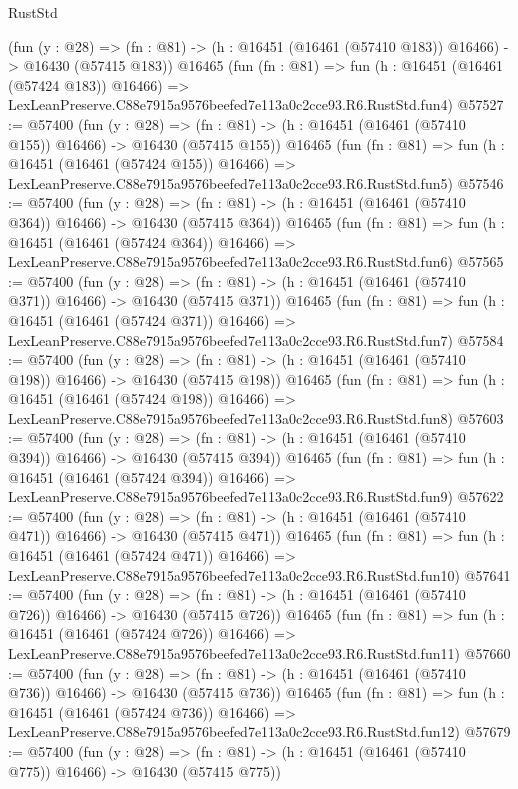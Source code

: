 \begin{lexlean}{RustStd}
\begin{coremodule}
    (fun (y : @28) =>
    (fn : @81) -> (h : @16451 (@16461 (@57410 @183)) @16466) -> @16430 (@57415 @183))
    @16465
    (fun (fn : @81) =>
    fun (h : @16451 (@16461 (@57424 @183)) @16466) =>
    LexLeanPreserve.C88e7915a9576beefed7e113a0c2cce93.R6.RustStd.fun4)
@57527 := @57400
    (fun (y : @28) =>
    (fn : @81) -> (h : @16451 (@16461 (@57410 @155)) @16466) -> @16430 (@57415 @155))
    @16465
    (fun (fn : @81) =>
    fun (h : @16451 (@16461 (@57424 @155)) @16466) =>
    LexLeanPreserve.C88e7915a9576beefed7e113a0c2cce93.R6.RustStd.fun5)
@57546 := @57400
    (fun (y : @28) =>
    (fn : @81) -> (h : @16451 (@16461 (@57410 @364)) @16466) -> @16430 (@57415 @364))
    @16465
    (fun (fn : @81) =>
    fun (h : @16451 (@16461 (@57424 @364)) @16466) =>
    LexLeanPreserve.C88e7915a9576beefed7e113a0c2cce93.R6.RustStd.fun6)
@57565 := @57400
    (fun (y : @28) =>
    (fn : @81) -> (h : @16451 (@16461 (@57410 @371)) @16466) -> @16430 (@57415 @371))
    @16465
    (fun (fn : @81) =>
    fun (h : @16451 (@16461 (@57424 @371)) @16466) =>
    LexLeanPreserve.C88e7915a9576beefed7e113a0c2cce93.R6.RustStd.fun7)
@57584 := @57400
    (fun (y : @28) =>
    (fn : @81) -> (h : @16451 (@16461 (@57410 @198)) @16466) -> @16430 (@57415 @198))
    @16465
    (fun (fn : @81) =>
    fun (h : @16451 (@16461 (@57424 @198)) @16466) =>
    LexLeanPreserve.C88e7915a9576beefed7e113a0c2cce93.R6.RustStd.fun8)
@57603 := @57400
    (fun (y : @28) =>
    (fn : @81) -> (h : @16451 (@16461 (@57410 @394)) @16466) -> @16430 (@57415 @394))
    @16465
    (fun (fn : @81) =>
    fun (h : @16451 (@16461 (@57424 @394)) @16466) =>
    LexLeanPreserve.C88e7915a9576beefed7e113a0c2cce93.R6.RustStd.fun9)
@57622 := @57400
    (fun (y : @28) =>
    (fn : @81) -> (h : @16451 (@16461 (@57410 @471)) @16466) -> @16430 (@57415 @471))
    @16465
    (fun (fn : @81) =>
    fun (h : @16451 (@16461 (@57424 @471)) @16466) =>
    LexLeanPreserve.C88e7915a9576beefed7e113a0c2cce93.R6.RustStd.fun10)
@57641 := @57400
    (fun (y : @28) =>
    (fn : @81) -> (h : @16451 (@16461 (@57410 @726)) @16466) -> @16430 (@57415 @726))
    @16465
    (fun (fn : @81) =>
    fun (h : @16451 (@16461 (@57424 @726)) @16466) =>
    LexLeanPreserve.C88e7915a9576beefed7e113a0c2cce93.R6.RustStd.fun11)
@57660 := @57400
    (fun (y : @28) =>
    (fn : @81) -> (h : @16451 (@16461 (@57410 @736)) @16466) -> @16430 (@57415 @736))
    @16465
    (fun (fn : @81) =>
    fun (h : @16451 (@16461 (@57424 @736)) @16466) =>
    LexLeanPreserve.C88e7915a9576beefed7e113a0c2cce93.R6.RustStd.fun12)
@57679 := @57400
    (fun (y : @28) =>
    (fn : @81) -> (h : @16451 (@16461 (@57410 @775)) @16466) -> @16430 (@57415 @775))

\end{coremodule}
\end{lexlean}
